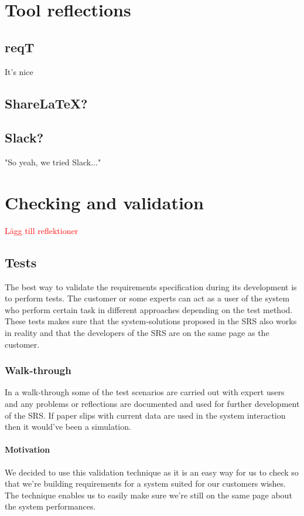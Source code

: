 \documentclass[10pt]{article}
\newcommand\todo[1]{\textcolor{red}{#1}}
\begin{document}
\section{Tool reflections}
\noindent
\subsection{reqT}
It's nice
\subsection{ShareLaTeX?}

\subsection{Slack?}
"So yeah, we tried Slack..."

\section{Checking and validation}
\noindent
\todo{Lägg till reflektioner}
\subsection{Tests}
The best way to validate the requirements specification during its development is to perform tests. The customer or some experts can act as a user of the system who perform certain task in different approaches depending on the test method. These tests makes sure that the system-solutions proposed in the SRS also works in reality and that the developers of the SRS are on the same page as the customer.
\subsubsection{Walk-through}
In a walk-through some of the test scenarios are carried out with expert users and any problems or reflections are documented and used for further development of the SRS. If paper slips with current data are used in the system interaction then it would've been a simulation.
\paragraph{Motivation}
\hfill \break
We decided to use this validation technique as it is an easy way for us to check so that we're building requirements for a system suited for our customers wishes. The technique enables us to easily make sure we're still on the same page about the system performances.
\end{document}
